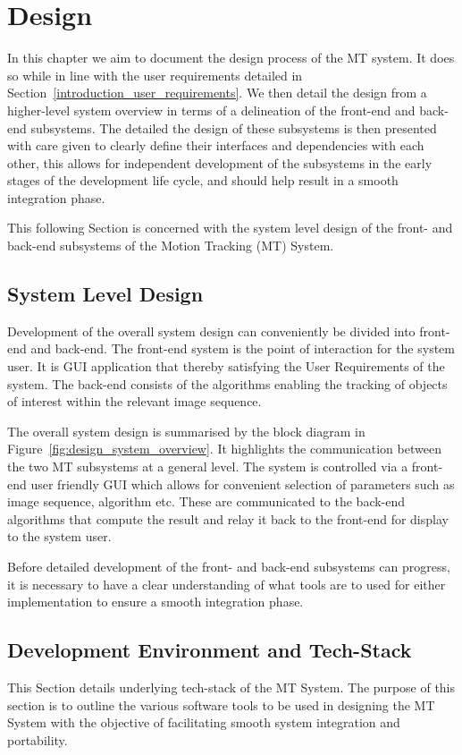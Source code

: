 \chapter{Design}\label{chapter_design}
In this chapter we aim to document the design process of the MT system. It does so
while in line with the user requirements detailed in 
Section~\ref{introduction_user_requirements}. 
We then detail the design from a higher-level system overview in terms of a
delineation of the front-end and back-end subsystems. The detailed the design of
these subsystems is then presented with care given to clearly define their
interfaces and dependencies with each other, this allows for independent
development of the subsystems in the early stages of the development life cycle,
and should help result in a smooth integration phase.

This following Section is concerned with the system level design of the
front- and back-end subsystems of the Motion Tracking (MT) System.

\section{System Level Design}
Development of the overall system design can conveniently be divided into
front-end and back-end. The front-end system is the point of interaction for the
system user. It is GUI application that thereby satisfying the User Requirements
of the system. The back-end consists of the algorithms enabling the tracking of
objects of interest within the relevant image sequence.

The overall system design is summarised by the block diagram in
Figure~\ref{fig:design_system_overview}. It highlights the communication between the
two MT subsystems at a general level. The system is controlled via a front-end user
friendly GUI which allows for convenient selection of parameters such as
image sequence, algorithm etc. These are communicated to the back-end
algorithms that compute the result and relay it back to the front-end for display to
the system user.


Before detailed development of the front- and back-end subsystems can progress, it is necessary to
have a clear understanding of what tools are to used for either implementation to
ensure a smooth integration phase.

\section{Development Environment and Tech-Stack}
This Section details underlying tech-stack of the MT System. The
purpose of this section is to outline the various software tools to be used in
designing the MT System with the objective of facilitating smooth system integration and
portability. 

